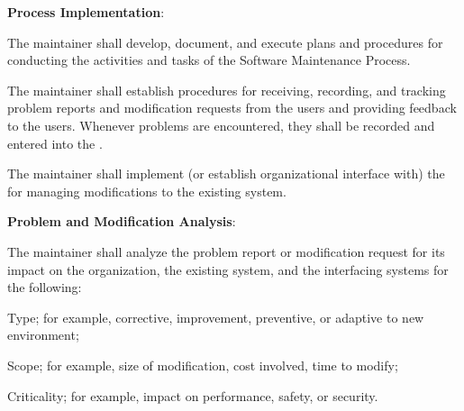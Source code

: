 			\begin{adjustwidth}{2em}{0pt} 

				\begin{compactenum}

					\item {\bf Process Implementation}:

					\begin{compactenum}

						\item The maintainer shall develop, document, and execute plans and procedures for conducting the activities and tasks of the Software Maintenance Process.

						\item The maintainer shall establish procedures for receiving, recording, and tracking problem reports and modification requests from the users and providing feedback to the users. Whenever problems are encountered, they shall be recorded and entered into the .

						\item The maintainer shall implement (or establish organizational interface with) the  for managing modifications to the existing system.

					\end{compactenum}


					\item {\bf Problem and Modification Analysis}:

					\begin{compactenum}

						\item The maintainer shall analyze the problem report or modification request for its impact on the organization, the existing system, and the interfacing systems for the following:

						\begin{compactenum}

							\item Type; for example, corrective, improvement, preventive, or adaptive to new environment;

							\item Scope; for example, size of modification, cost involved, time to modify;

							\item Criticality; for example, impact on performance, safety, or security.


\end{compactenum}
\end{compactenum}
\end{compactenum}
\end{adjustwidth}
